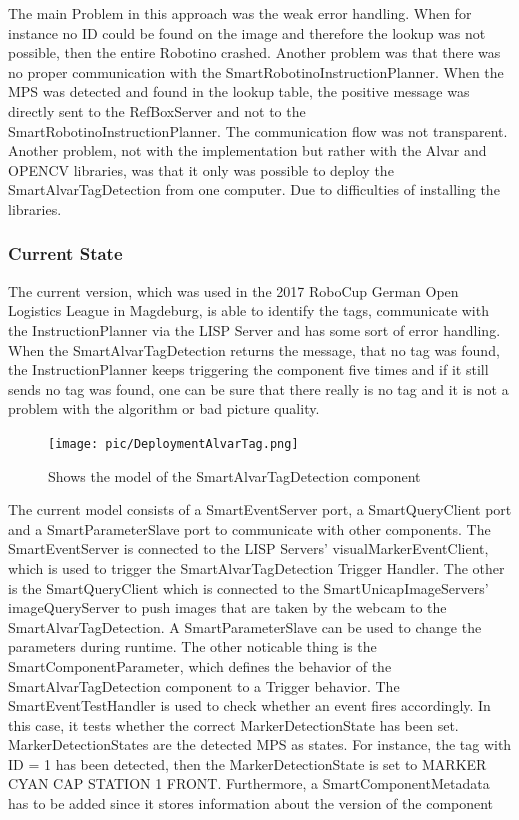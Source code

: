 The main Problem in this approach was the weak error handling. When for instance no ID could be found on the image and therefore the lookup was not possible, then the entire Robotino crashed. Another problem was that there was no proper communication with the SmartRobotinoInstructionPlanner. When the MPS was detected and found in the lookup table, the positive message was directly sent to the RefBoxServer and not to the SmartRobotinoInstructionPlanner. The communication flow was not transparent. Another problem, not with the implementation but rather with the Alvar and OPENCV libraries, was that it only was possible to deploy the SmartAlvarTagDetection from one computer. Due to difficulties of installing the libraries.



\subsubsection{Current State}

The current version, which was used in the 2017 RoboCup German Open Logistics League in Magdeburg, is able to identify the tags, communicate with the InstructionPlanner via the LISP Server and has some sort of error handling. When the SmartAlvarTagDetection returns the message, that no tag was found, the InstructionPlanner keeps triggering the component five times and if it still sends no tag was found, one can be sure that there really is no tag and it is not a problem with the algorithm or bad picture quality. \\

\begin{figure}[h]
\centering
\texttt{[image: pic/DeploymentAlvarTag.png]}
\caption{Shows the model of the SmartAlvarTagDetection component}
\label{fig:smartAlvarFlow}
\end{figure}



The current model consists of a SmartEventServer port, a SmartQueryClient port and a SmartParameterSlave port to communicate with other components. The SmartEventServer is connected to the LISP Servers' visualMarkerEventClient, which is used to trigger the SmartAlvarTagDetection Trigger Handler. The other is the SmartQueryClient which is connected to the SmartUnicapImageServers' imageQueryServer to push images that are taken by the webcam to the SmartAlvarTagDetection. A SmartParameterSlave can be used to change the parameters during runtime. The other noticable thing is the SmartComponentParameter, which defines the behavior of the SmartAlvarTagDetection component to a Trigger behavior. The SmartEventTestHandler is used to check whether an event fires accordingly. In this case, it tests whether the correct MarkerDetectionState has been set. MarkerDetectionStates are the detected MPS as states. For instance, the tag with ID = 1 has been detected, then the MarkerDetectionState is set to MARKER CYAN CAP STATION 1 FRONT. Furthermore, a SmartComponentMetadata has to be added since it stores information about the version of the component\\

